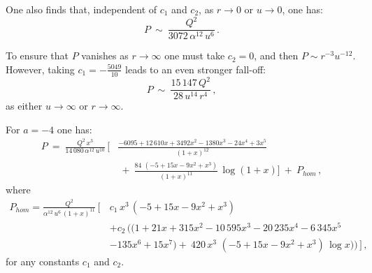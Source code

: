 \documentclass[11pt]{article}
\numberwithin{equation}{section}
\begin{document}
One also finds that, independent of $c_1$ and $c_2$, as $r \to 0$ or $u \to 0$, one has:
%
\begin{equation}
P  ~\sim~ \frac{Q^2}{3072 \,\alpha^{12}\, u^6}  \,.
\label{Psrc-2}
\end{equation}
%

To ensure that $P$ vanishes as $r \to \infty$ one must take $c_2=0$, and then $P \sim r^{-3} u^{-12}$.  However, taking $c_1 = -\frac{5049}{10}$ leads to an even stronger fall-off:  
%
\begin{equation}
P  ~\sim~ \frac{15\, 147 \, Q^2}{28\, u^{14}\, r^4}  \,,
\label{Pasymp-2}
\end{equation}
%
as either $u \to \infty$ or $r \to \infty$.


For $a=-4$ one has:
%
\begin{equation}
\begin{aligned}
P  ~=~ \frac{Q^2\,x^3}{14\,080\,\alpha^{12}\, u^{10}} \,\bigg[&  \frac{-6095  +12\, 610  x +3492 x^2 -1380 x^3 - 24 x^4+3 x^5  }{(1+x)^{12} }\\
& ~+~ \frac{84\, \,(-5 +15x  - 9 x^2 + x^3) }{  (1+x)^{11}}\, \log (1+ x) \bigg] ~+~ P_{hom} \,,
\end{aligned}
\label{Ppart-4a}
\end{equation}
%
where 
%
\begin{equation}
\begin{aligned}
P_{hom}   = \frac{Q^2}{\alpha^{12}\, u^6\,  (1+x)^{11}} \,\bigg[\,   & c_1\, x^3 \,(-5 +15x  - 9 x^2 + x^3)  \\
&  +c_2 \, \Big((1 +21 x +315 x^2 - 10\,595 x^3 - 20\, 235 x^4 - 6\, 345  x^5 \\&  - 135  x^6 +  15 x^7) + ~420 \,x^3 \, \,(-5 +15x  - 9 x^2 + x^3)\, \log x)  \Big)  \,  \bigg]   \,,
\end{aligned}
\label{Phom-4}
\end{equation}
%
for any constants $c_1$ and $c_2$.
\end{document}
